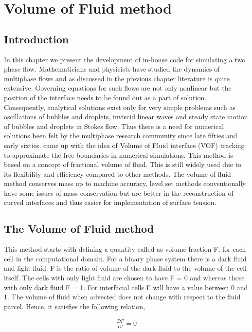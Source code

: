 \chapter{Volume of Fluid method}

\section{Introduction}
In this chapter we present the development of in-house code for simulating a two phase flow.
Mathematicians and physicists have studied the dynamics of multiphase flows and as discussed in the previous chapter
literature is quite extensive. Governing equations for such flows are not only nonlinear but the 
position of the interface needs to be found out as a part of solution. Consequently, analytical solutions exist only for very simple problems such as oscillations of bubbles and droplets,
inviscid linear waves and steady state motion of bubbles and droplets in Stokes flow. Thus there is a need for numerical solutions been felt by the multiphase
research community since late fifties and early sixties. 
\cite{Hirt1981} came up with the idea of Volume of Fluid interface {(VOF)} tracking to approximate
the free boundaries in numerical simulations. This method is based on a concept of fractional volume of fluid. This is still widely used due to its flexibility and efficiency
compared to other methods. 
The volume of fluid method conserves mass up to machine accuracy, level set methods conventionally have some issues of mass conservation but
are better in the reconstruction of curved interfaces and thus easier for implementation of surface tension.

\section{The Volume of Fluid method}
This method starts with defining a quantity called as volume fraction F, for each cell in the computational domain. For a binary phase system there is a dark fluid and light fluid.
F is the ratio of volume of the dark fluid to the volume of the cell itself. The cells with only light fluid are chosen to have F = 0 and whereas those with only dark fluid F = 1. For interfacial cells
F will have a value between 0 and 1. The volume of fluid when advected does not change with respect to the fluid parcel. Hence, it satisfies the following relation,

\begin{eqnarray}
\frac{D F}{D t} = 0 
\end{eqnarray}

